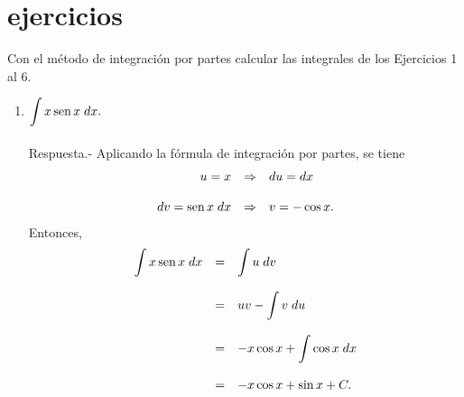 \section{ejercicios}
Con el método de integración por partes calcular las integrales de los Ejercicios 1 al 6.\\

    \begin{enumerate}[\bfseries 1.]

	\item $\displaystyle\int x\mathop{\mbox{\normalfont sen}}\nolimits x \; dx.$\\\\
	    Respuesta.-\; Aplicando la fórmula de integración por partes, se tiene
	    $$\begin{array}{rcl} 
		u=x &\Rightarrow&du=dx\\\\
		dv=\mathop{\mbox{\normalfont sen}}\nolimits x\; dx &\Rightarrow& v=-\cos x.
	    \end{array}$$
	    Entonces,
	    $$\begin{array}{rcl}
		\displaystyle\int x\mathop{\mbox{\normalfont sen}}\nolimits x\; dx &=& \displaystyle\int u\; dv\\\\
					       &=& uv - \displaystyle\int v\; du\\\\
					       &=& -x\cos x + \displaystyle\int \cos x\; dx\\\\
					       &=& -x\cos x + \sin x + C.
	    \end{array}$$
	    \vspace{0.5cm}


\end{enumerate}
